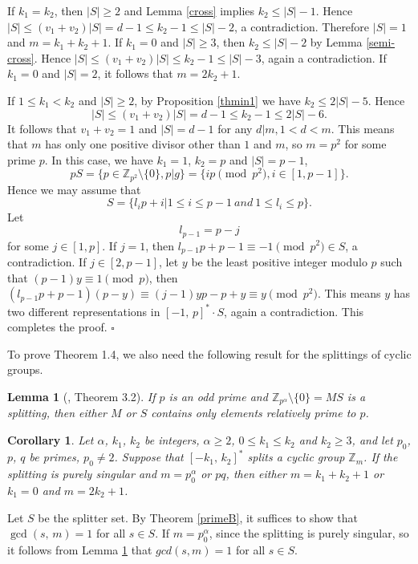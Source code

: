 \documentclass[12pt]{article}
\newtheorem{lem}{Lemma}[section]
\newtheorem{coro}{Corollary}[section]
\newtheorem{open problem}{Open problem}[section]
\newcommand{\qed}{\nopagebreak\hspace*{\fill}$\square$\par\vskip2mm}
\begin{document}
If $k_1=k_2$, then $|S|\geq 2$ and Lemma \ref{cross} implies $k_2\leq |S|-1$.
Hence $|S|\leq (v_1+v_2)|S|=d-1\leq k_2-1\leq |S|-2$, a contradiction.
Therefore $|S|=1$ and $m=k_1+k_2+1$.  If $k_1=0$ and $|S|\geq 3$, then $k_2\leq |S|-2$ by Lemma \ref{semi-cross}.
Hence $|S|\leq (v_1+v_2)|S|\le k_2-1\leq |S|-3$, again a contradiction. If $k_1=0$ and $|S|=2$, it follows that $m=2k_2+1$.

If $1\leq k_1<k_2$ and $|S|\geq 2$, by Proposition \ref{thmin1} we have $k_2\leq 2|S|-5$.
Hence $$|S|\leq (v_1+v_2)|S|=d-1\leq k_2-1\leq 2|S|-6.$$
It follows that $v_1+v_2=1$ and $|S|=d-1$ for any $d|m, 1<d<m$. This means that $m$ has only one positive divisor other than $1$ and $m$, so $m=p^2$ for some prime $p$. In this case, we have $k_1=1$, $k_2=p$ and $|S|=p-1$,
$$pS=\{p\in\mathbb{Z}_{p^2}\setminus\{0\}, p|g\}=\{ip\pmod{p^2}, i\in[1, p-1]\}.$$
Hence we may assume that $$S=\{l_ip+i|1\leq i\leq p-1 \ and \ 1\leq l_i\leq p\}.$$
Let $$l_{p-1}=p-j$$ for some $j\in[1,p]$. If $j=1$, then $l_{p-1}p+p-1\equiv-1\pmod{p^2}\in S$, a contradiction. If $j\in[2, p-1]$, let $y$ be the least positive integer modulo $p$ such that $(p-1)y\equiv1\pmod{p}$,  then $(l_{p-1}p+p-1)(p-y)\equiv (j-1)yp-p+y\equiv y \pmod{p^2}$. This means $y$ has two different representations in $[-1, \,p]^\ast\cdot S$, again a contradiction. This completes the proof.
\qed

To prove Theorem 1.4, we also need the following result for the splittings of cyclic groups.

\begin{lem}[\cite{[SS]}, Theorem 3.2] \label{p-group-sp}
If $p$ is an odd prime and $\mathbb{Z}_{p^{\alpha}}\setminus \{0\}=MS$ is a splitting, then
either $M$ or $S$ contains only elements relatively prime to $p$.
\end{lem}

\begin{coro} \label{cyclic-p-gr}
Let $\alpha$, $k_1$, $k_2$ be integers, $\alpha \geq 2$, $0\leq k_1\leq k_2$ and $k_2\ge3$,
and let $p_0$, $p$, $q$ be primes, $ p_0\ne2$.
Suppose that $[-k_1, \,k_2]^*$ splits a cyclic group $\mathbb{Z}_{m}$.
If the splitting is purely singular and $m=p_0^{\alpha}$ or $pq$,
then either $m=k_1+k_2+1$ or $k_1=0$  and $m=2k_2+1$.
\end{coro}


Let $S$ be the splitter set. By Theorem \ref{primeB}, it suffices to show that $\gcd(s, \, m)=1$ for all $s\in S$.
If $m=p_0^{\alpha}$, since the splitting is purely singular, so
it follows from Lemma \ref{p-group-sp} that $gcd(s,m)=1$ for all $s\in S$.
\end{document}

